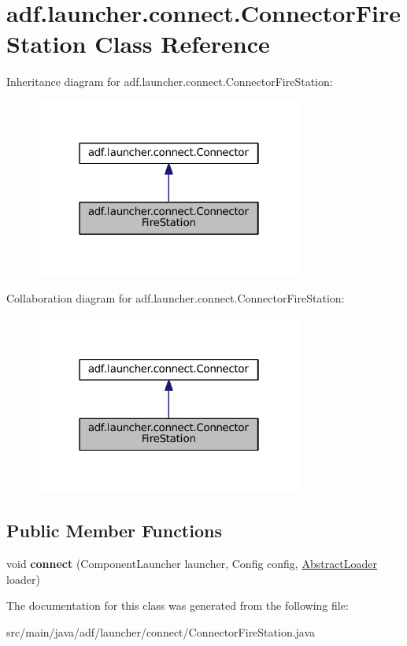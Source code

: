\hypertarget{classadf_1_1launcher_1_1connect_1_1ConnectorFireStation}{}\section{adf.\+launcher.\+connect.\+Connector\+Fire\+Station Class Reference}
\label{classadf_1_1launcher_1_1connect_1_1ConnectorFireStation}


Inheritance diagram for adf.\+launcher.\+connect.\+Connector\+Fire\+Station\+:
\nopagebreak
\begin{figure}[H]
\begin{center}
\leavevmode
\includegraphics[width=250pt]{classadf_1_1launcher_1_1connect_1_1ConnectorFireStation__inherit__graph}
\end{center}
\end{figure}


Collaboration diagram for adf.\+launcher.\+connect.\+Connector\+Fire\+Station\+:
\nopagebreak
\begin{figure}[H]
\begin{center}
\leavevmode
\includegraphics[width=250pt]{classadf_1_1launcher_1_1connect_1_1ConnectorFireStation__coll__graph}
\end{center}
\end{figure}
\subsection*{Public Member Functions}
\begin{DoxyCompactItemize}
\item 
\hypertarget{classadf_1_1launcher_1_1connect_1_1ConnectorFireStation_add7763c53218ab2336b6a5f5873790aa}{}\label{classadf_1_1launcher_1_1connect_1_1ConnectorFireStation_add7763c53218ab2336b6a5f5873790aa} 
void {\bfseries connect} (Component\+Launcher launcher, Config config, \hyperlink{classadf_1_1component_1_1AbstractLoader}{Abstract\+Loader} loader)
\end{DoxyCompactItemize}


The documentation for this class was generated from the following file\+:\begin{DoxyCompactItemize}
\item 
src/main/java/adf/launcher/connect/Connector\+Fire\+Station.\+java\end{DoxyCompactItemize}
